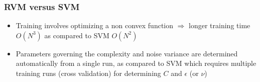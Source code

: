 \documentclass[t,14pt]{beamer}
\begin{document}
\begin{frame}
  \frametitle{RVM versus SVM}
  \begin{itemize}
    \item {
            Training involves optimizing a non convex function 
            $\Rightarrow$ 
            longer training time $O(N^3)$ as compared to SVM $O(N^2)$
          }
    \item {
            Parameters governing the complexity and noise variance are 
            determined automatically from a single run, as compared to SVM 
            which requires multiple training runs (cross validation) for 
            determining $C$ and $\epsilon$ (or $\nu$)
          }
  \end{itemize}
\end{frame}
\end{document}
